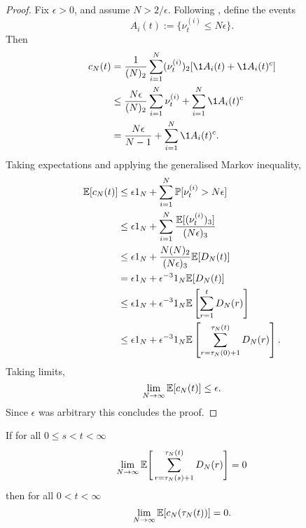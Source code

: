 \begin{proof}
Fix $\epsilon>0$, and assume $N>2/\epsilon$.
Following \textcite{mohle2003}, define the events
\begin{equation}\label{eq:define_Ai_events}
A_i(t) := \{ \nu_t^{(i)} \leq N\epsilon \} .
\end{equation}
Then
\begin{align*}
c_N(t)
&= \frac{1}{(N)_2} \sum_{i=1}^N (\nu_t^{(i)})_2 [\1{A_i(t)} + \1{A_i(t)^c}] \\
&\leq \frac{N\epsilon}{(N)_2} \sum_{i=1}^N \nu_t^{(i)}
        + \sum_{i=1}^N \1{A_i(t)^c} \\
&= \frac{N\epsilon}{N-1} + \sum_{i=1}^N \1{A_i(t)^c} .
\end{align*}
Taking expectations and applying the generalised Markov inequality,
\begin{align*}
\mathbb{E}[c_N(t)]
&\leq \epsilon1_N + \sum_{i=1}^N \mathbb{P}[ \nu_t^{(i)} > N\epsilon ] \\
&\leq \epsilon1_N 
        + \sum_{i=1}^N \frac{\mathbb{E}[ (\nu_t^{(i)})_3 ]}{(N\epsilon)_3} \\
&\leq \epsilon1_N + \frac{N(N)_2}{(N\epsilon)_3} \mathbb{E}[ D_N(t) ] \\
&= \epsilon1_N + \epsilon^{-3}1_N \mathbb{E}[ D_N(t) ] \\
&\leq \epsilon1_N + \epsilon^{-3}1_N 
        \mathbb{E}\left[ \sum_{r=1}^t D_N(r) \right] \\
&\leq \epsilon1_N + \epsilon^{-3}1_N
        \mathbb{E}\left[ \sum_{r=\tau_N(0)+1}^{\tau_N(t)} D_N(r) \right] .
\end{align*}
Taking limits, 
\begin{equation*}
\lim_{N\to\infty} \mathbb{E}[c_N(t)] \leq \epsilon .
\end{equation*}
Since $\epsilon$ was arbitrary this concludes the proof.
\end{proof}


\begin{lemma} \label{thm:DNimpliescN_2}
If for all $0 \leq s < t < \infty$
\begin{equation*}
\lim_{ N \rightarrow \infty } \mathbb{E}\Bigg[ \sum_{ r = \tau_N( s ) + 1 }^{ \tau_N( t ) } D_N( r ) \Bigg] = 0
\end{equation*}
then for all $ 0 < t < \infty $
\begin{equation*}
\lim_{ N \rightarrow \infty } \mathbb{E}[ c_N( \tau_N(t) ) ] = 0 .
\end{equation*}
\end{lemma}

